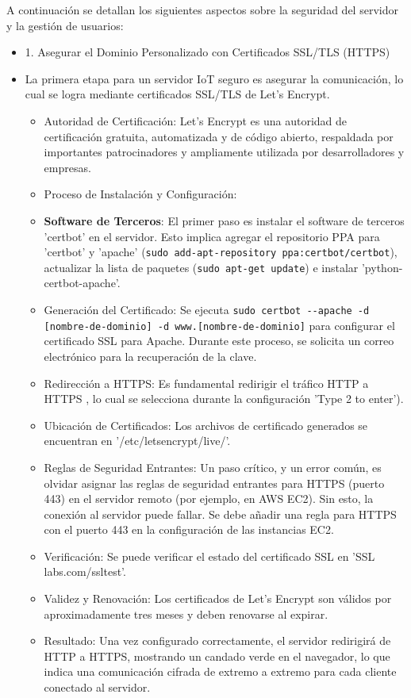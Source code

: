 \documentclass{report}
\begin{document}
A continuación se detallan los siguientes aspectos sobre la seguridad del servidor y la gestión de usuarios:
\begin{itemize}
    \item 1. Asegurar el Dominio Personalizado con Certificados SSL/TLS (HTTPS)
    \item La primera etapa para un servidor IoT seguro es asegurar la comunicación, lo cual se logra mediante certificados  SSL/TLS de Let's Encrypt.
    \begin{itemize}
        \item Autoridad de Certificación: Let's Encrypt es una autoridad de certificación gratuita, automatizada y de código abierto, respaldada por 
        importantes patrocinadores y ampliamente utilizada por desarrolladores y empresas.
        \item Proceso de Instalación y Configuración:
        \item \textbf{Software de Terceros}: El primer paso es instalar el software de terceros 'certbot' en el servidor. Esto 
        implica agregar el repositorio PPA para 'certbot' y 'apache' (\verb|sudo add-apt-repository ppa:certbot/certbot|), 
        actualizar la lista de paquetes (\verb|sudo apt-get update|) e instalar 'python-certbot-apache'.
        \item Generación del Certificado: Se ejecuta  \verb|sudo certbot --apache -d [nombre-de-dominio] -d www.[nombre-de-dominio]| para configurar el 
        certificado SSL para Apache. Durante este proceso, se solicita un correo electrónico para la recuperación de la clave.
        \item Redirección a HTTPS: Es fundamental  redirigir el tráfico HTTP a HTTPS , lo cual se selecciona durante la configuración 
        'Type 2 to enter').
        \item Ubicación de Certificados: Los archivos de certificado generados se encuentran en '/etc/letsencrypt/live/'.
        \item Reglas de Seguridad Entrantes: Un paso crítico, y un error común, es olvidar asignar las  reglas de seguridad entrantes para HTTPS 
        (puerto 443)  en el servidor remoto (por ejemplo, en AWS EC2). Sin esto, la conexión al servidor puede fallar. Se debe añadir una regla para 
        HTTPS con el puerto 443 en la configuración de las instancias EC2.
        \item Verificación: Se puede verificar el estado del certificado SSL en 'SSL labs.com/ssltest'.
        \item Validez y Renovación: Los certificados de Let's Encrypt son válidos por aproximadamente tres meses y deben renovarse al expirar.
        \item Resultado: Una vez configurado correctamente, el servidor redirigirá de HTTP a HTTPS, mostrando un candado verde en el navegador, 
        lo que indica una  comunicación cifrada de extremo a extremo  para cada cliente conectado al servidor.
    \end{itemize}


\end{itemize}
\end{document}
